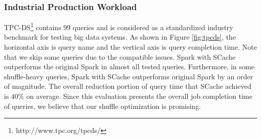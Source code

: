 
\subsubsection{Industrial Production Workload}
TPC-DS\footnote{http://www.tpc.org/tpcds/} contains 99 queries and is considered as a standardized industry benchmark for testing big data systems. 
As shown in Figure \ref{fig:tpcds}, the horizontal axis is query name and the vertical axis is query completion time. 
Note that we skip some queries due to the compatible issues. 
Spark with SCache outperforms the original Spark in almost all tested queries. 
Furthermore, in some shuffle-heavy queries, Spark with SCache outperforms original Spark by an order of magnitude. 
The overall reduction portion of query time that SCache achieved is $40\%$ on average. 
Since this evaluation presents the overall job completion time of queries, we believe that our shuffle optimization is promising.


